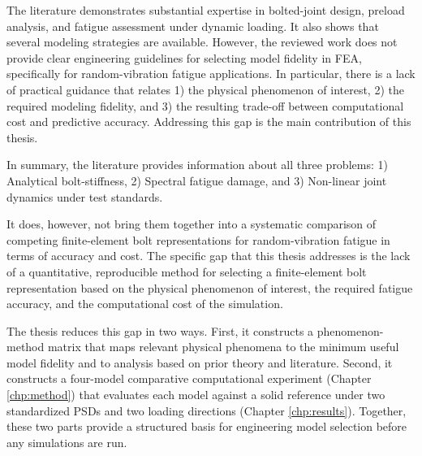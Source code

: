 \documentclass[a4paper,twoside]{bth}
\begin{document}
The literature demonstrates substantial expertise in bolted-joint design, preload analysis, and fatigue assessment under dynamic loading. It also shows that several modeling strategies are available. However, the reviewed work does not provide clear engineering guidelines for selecting model fidelity in \ac{FEA},  specifically for random-vibration fatigue applications. In particular, there is a lack of practical guidance that relates 1) the physical phenomenon of interest, 2) the required modeling fidelity, and 3) the resulting trade-off between computational cost and predictive accuracy. Addressing this gap is the main contribution of this thesis.

In summary, the literature provides information about all three problems: 1) Analytical bolt-stiffness, 2) Spectral fatigue damage, and 3) Non-linear joint dynamics under test standards.

It does, however, not bring them together into a systematic comparison of competing finite-element bolt representations for random-vibration fatigue in terms of accuracy and cost. The specific gap that this thesis addresses is the lack of a quantitative, reproducible method for selecting a finite-element bolt representation based on the physical phenomenon of interest, the required fatigue accuracy, and the computational cost of the simulation.

The thesis reduces this gap in two ways. First, it constructs a phenomenon-method matrix that maps relevant physical phenomena to the minimum useful model fidelity and to analysis based on prior theory and literature. Second, it constructs a four-model comparative computational experiment (Chapter \ref{chp:method}) that evaluates each model against a solid reference under two standardized \ac{PSD}s and two loading directions (Chapter \ref{chp:results}). Together, these two parts provide a structured basis for engineering model selection before any simulations are run.
\end{document}
